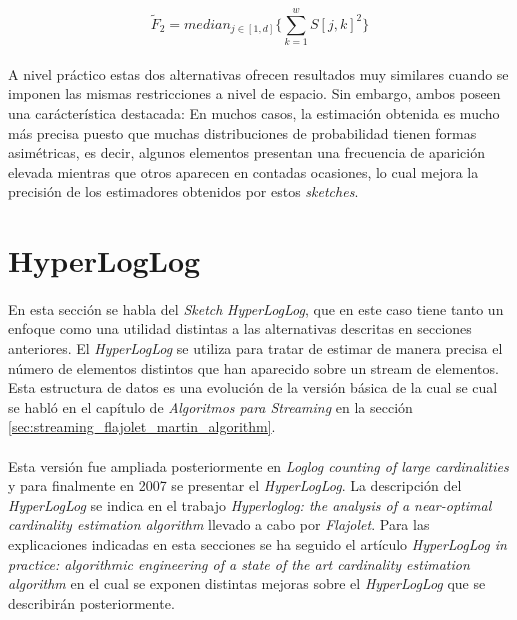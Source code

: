 \documentclass{subfiles}
\begin{document}
      \begin{equation}
      \label{eq:ams_sketch_f2}
        \widetilde{F}_2 = median_{j \in [1,d]}\{\sum_{k=1}^w S[j, k]^2\}
      \end{equation}

      \paragraph{}
      A nivel práctico estas dos alternativas ofrecen resultados muy similares cuando se imponen las mismas restricciones a nivel de espacio. Sin embargo, ambos poseen una carácterística destacada: En muchos casos, la estimación obtenida es mucho más precisa puesto que muchas distribuciones de probabilidad tienen formas asimétricas, es decir, algunos elementos presentan una frecuencia de aparición elevada mientras que otros aparecen en contadas ocasiones, lo cual mejora la precisión de los estimadores obtenidos por estos \emph{sketches}.

    \section{HyperLogLog}
    \label{sec:hyper_log_log}

      \paragraph{}
      En esta sección se habla del \emph{Sketch} \emph{HyperLogLog}, que en este caso tiene tanto un enfoque como una utilidad distintas a las alternativas descritas en secciones anteriores. El \emph{HyperLogLog} se utiliza para tratar de estimar de manera precisa el número de elementos distintos que han aparecido sobre un stream de elementos. Esta estructura de datos es una evolución de la versión básica de la cual se cual se habló en el capítulo de \emph{Algoritmos para Streaming} en la sección \ref{sec:streaming_flajolet_martin_algorithm}.

      \paragraph{}
      Esta versión fue ampliada posteriormente en \emph{Loglog counting of large cardinalities} \cite{durand2003loglog} y para finalmente en 2007 se presentar el \emph{HyperLogLog}. La descripción del \emph{HyperLogLog} se indica en el trabajo \emph{Hyperloglog: the analysis of a near-optimal cardinality estimation algorithm} \cite{flajolet2007hyperloglog} llevado a cabo por \emph{Flajolet}. Para las explicaciones indicadas en esta secciones se ha seguido el artículo \emph{HyperLogLog in practice: algorithmic engineering of a state of the art cardinality estimation algorithm} \cite{heule2013hyperloglog} en el cual se exponen distintas mejoras sobre el \emph{HyperLogLog} que se describirán posteriormente.
\end{document}
